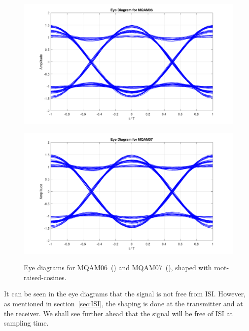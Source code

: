	\begin{figure}[H]
	\centering
	\begin{minipage}{0.45\textwidth}
		\centering
		\includegraphics[width=1\textwidth]		
		{./sdf/m_qam_system/figures/simulations/01_noISI/MQAM06_edl.pdf}
		\subcaption{}\label{fig:ISImqam6ed}
	\end{minipage}
	\begin{minipage}{0.45\textwidth}
		\centering
		\includegraphics[width=1\textwidth]
		{sdf/m_qam_system/figures/simulations/01_noISI/MQAM07_edl.pdf}
		\subcaption{}\label{fig:ISImqam7ed}
	\end{minipage}
	\caption{Eye diagrams for MQAM06~() and 
		MQAM07~(), shaped with root-raised-cosines.}
\end{figure}

	It can be seen in the eye diagrams that the signal is not free from ISI. 
	However, as mentioned in section~\ref{sec:ISI}, the shaping is done at the 
	transmitter and at the receiver. We shall see further ahead that the signal 
	will be free of ISI at sampling time.


